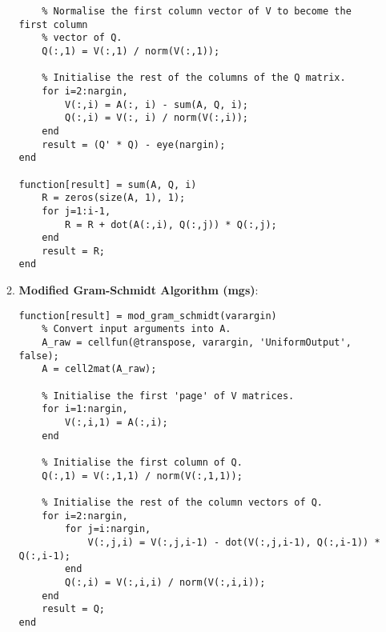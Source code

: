 \documentclass{article}
\begin{document}
\begin{enumerate}
\begin{enumerate}
\begin{verbatim}
    % Normalise the first column vector of V to become the first column
    % vector of Q.
    Q(:,1) = V(:,1) / norm(V(:,1));
    
    % Initialise the rest of the columns of the Q matrix.
    for i=2:nargin,
        V(:,i) = A(:, i) - sum(A, Q, i);
        Q(:,i) = V(:, i) / norm(V(:,i));
    end
    result = (Q' * Q) - eye(nargin);
end

function[result] = sum(A, Q, i)
    R = zeros(size(A, 1), 1);
    for j=1:i-1,
        R = R + dot(A(:,i), Q(:,j)) * Q(:,j);
    end    
    result = R;
end
		\end{verbatim}
		\item \textbf{Modified Gram-Schmidt Algorithm (mgs)}:
		\begin{verbatim}
function[result] = mod_gram_schmidt(varargin)
    % Convert input arguments into A.
    A_raw = cellfun(@transpose, varargin, 'UniformOutput', false);  
    A = cell2mat(A_raw);
    
    % Initialise the first 'page' of V matrices.
    for i=1:nargin,
        V(:,i,1) = A(:,i);
    end
    
    % Initialise the first column of Q.
    Q(:,1) = V(:,1,1) / norm(V(:,1,1));
    
    % Initialise the rest of the column vectors of Q.
    for i=2:nargin,
        for j=i:nargin,
            V(:,j,i) = V(:,j,i-1) - dot(V(:,j,i-1), Q(:,i-1)) * Q(:,i-1);
        end
        Q(:,i) = V(:,i,i) / norm(V(:,i,i));
    end    
    result = Q;
end

		\end{verbatim}
	\end{enumerate}
\end{enumerate}
\end{document}

